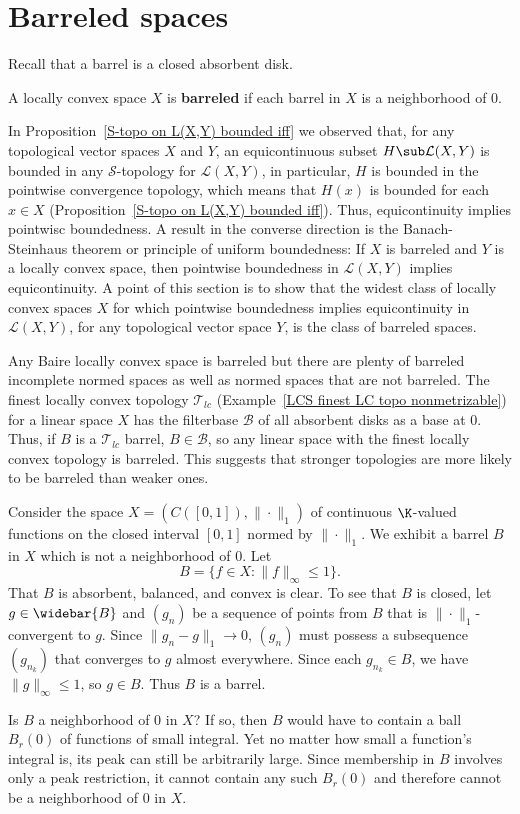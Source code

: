 \section{Barreled spaces}
Recall that a barrel is a closed absorbent disk.
\begin{definition}
A locally convex space $X$ is \textbf{barreled} if each barrel in $X$ is a neighborhood of $0$.
\end{definition}
In Proposition~\ref{S-topo on L(X,Y) bounded iff} we observed that, for any topological vector spaces $X$ and $Y$, an equicontinuous subset $H\sub\mathcal{L}(X,Y)$ is bounded in any $\mathcal{S}$-topology for $\mathcal{L}(X,Y)$, in particular, $H$ is bounded in the pointwise convergence topology, which means that $H(x)$ is bounded for each $x\in X$ (Proposition~\ref{S-topo on L(X,Y) bounded iff}). Thus, equicontinuity implies pointwisc boundedness. A result in the converse direction is the Banach-Steinhaus theorem or principle of uniform boundedness: If $X$ is barreled and $Y$ is a locally convex space, then pointwise boundedness in $\mathcal{L}(X,Y)$ implies equicontinuity. A point of this section is to show that the widest class of locally convex spaces $X$ for which pointwise boundedness implies equicontinuity in $\mathcal{L}(X,Y)$, for any topological vector space $Y$, is the class of barreled spaces.\par
Any Baire locally convex space is barreled but there are plenty of barreled incomplete normed spaces as well as normed spaces that are not barreled. The finest locally convex topology $\mathcal{T}_{lc}$ (Example~\ref{LCS finest LC topo nonmetrizable}) for a linear space $X$ has the filterbase $\mathcal{B}$ of all absorbent disks as a base at $0$. Thus, if $B$ is a $\mathcal{T}_{lc}$ barrel, $B\in\mathcal{B}$, so any linear space with the finest locally convex topology is barreled. This suggests that stronger topologies are more likely to be barreled than weaker ones.
\begin{example}\label{C([0,1]) nonbarreled}
Consider the space $X=(C([0,1]),\|\cdot\|_1)$ of continuous $\K$-valued functions on the closed interval $[0,1]$ normed by $\|\cdot\|_1$. We exhibit a barrel $B$ in $X$ which is not a neighborhood of $0$. Let
\[B=\{f\in X:\|f\|_\infty\leq 1\}.\]
That $B$ is absorbent, balanced, and convex is clear. To see that $B$ is closed, let $g\in\widebar{B}$ and $(g_n)$ be a sequence of points from $B$ that is $\|\cdot\|_1$-convergent to $g$. Since $\|g_n-g\|_1\to 0$, $(g_n)$ must possess a subsequence $(g_{n_k})$ that converges to $g$ almost everywhere. Since each $g_{n_k}\in B$, we have $\|g\|_\infty\leq 1$, so $g\in B$. Thus $B$ is a barrel.\par
Is $B$ a neighborhood of $0$ in $X$? If so, then $B$ would have to contain a ball $B_r(0)$ of functions of small integral. Yet no matter how small a function's integral is, its peak can still be arbitrarily large. Since membership in $B$ involves only a peak restriction, it cannot contain any such $B_r(0)$ and therefore cannot be a neighborhood of $0$ in $X$.
\end{example}
